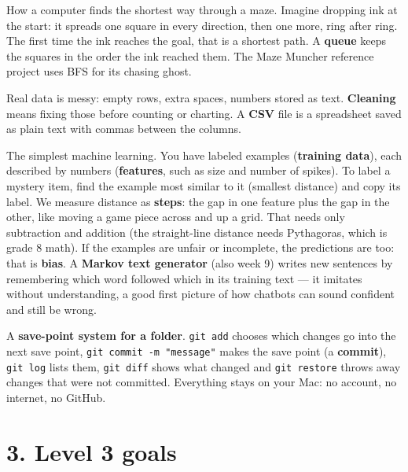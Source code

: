 \documentclass[level=3,teacher]{kidscode}
\begin{document}
\begin{description}[leftmargin=0pt,itemsep=6pt,font=\bfseries]
\item[Breadth-first search, BFS (week 7 stretch, buffer B1 and the final project).] How a computer finds the
shortest way through a maze. Imagine dropping ink at the start: it spreads one square in every
direction, then one more, ring after ring. The first time the ink reaches the goal, that is a
shortest path. A \textbf{queue} keeps the squares in the order the ink reached them. The Maze
Muncher reference project uses BFS for its chasing ghost.

\item[Data cleaning (week 8).] Real data is messy: empty rows, extra spaces, numbers stored as text.
\textbf{Cleaning} means fixing those before counting or charting. A \textbf{CSV} file is a
spreadsheet saved as plain text with commas between the columns.

\item[Nearest-neighbor classifier (week 9).] The simplest machine learning. You have labeled
examples (\textbf{training data}), each described by numbers (\textbf{features}, such as size and
number of spikes). To label a mystery item, find the example most similar to it (smallest
distance) and copy its label. We measure distance as \textbf{steps}: the gap in one feature plus the
gap in the other, like moving a game piece across and up a grid. That needs only subtraction and
addition (the straight-line distance needs Pythagoras, which is grade 8 math). If the examples are unfair or incomplete, the predictions are too:
that is \textbf{bias}. A \textbf{Markov text generator} (also week 9) writes new sentences by
remembering which word followed which in its training text --- it imitates without understanding,
a good first picture of how chatbots can sound confident and still be wrong.

\item[git (week 1 onwards).] A \textbf{save-point system for a folder}. \texttt{git add} chooses
which changes go into the next save point, \texttt{git commit -m "message"} makes the save point
(a \textbf{commit}), \texttt{git log} lists them, \texttt{git diff} shows what changed and
\texttt{git restore} throws away changes that were not committed. Everything stays on your Mac: no
account, no internet, no GitHub.
\end{description}

\section{3. Level 3 goals}
\end{document}
